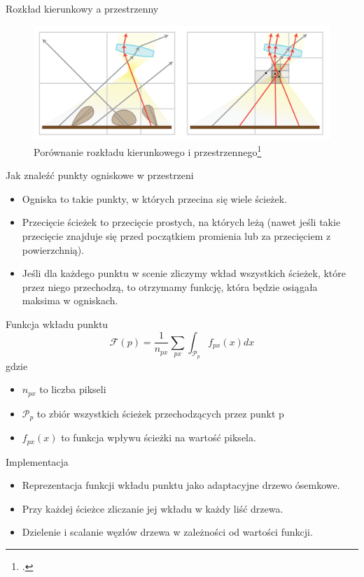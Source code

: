 \documentclass{beamer}
\begin{document}
\begin{frame}{Rozkład kierunkowy a przestrzenny}
    \begin{figure}
        \centering
        \includegraphics[width=1\linewidth]{img/directional_vs_spatial.png}
        \caption{Porównanie rozkładu kierunkowego i przestrzennego\footcite{Focal_Guiding}}
        \label{fig:enter-label}
    \end{figure}
\end{frame}

\begin{frame}{Jak znaleźć punkty ogniskowe w przestrzeni}
    \begin{itemize}
        \item Ogniska to takie punkty, w których przecina się wiele ścieżek.
        \item Przecięcie ścieżek to przecięcie prostych, na których leżą (nawet jeśli takie przecięcie znajduje się przed początkiem promienia lub za przecięciem z powierzchnią).
        \item Jeśli dla każdego punktu w scenie zliczymy wkład wszystkich ścieżek, które przez niego przechodzą, to otrzymamy funkcję, która będzie osiągała maksima w ogniskach.
    \end{itemize}
\end{frame}

\begin{frame}{Funkcja wkładu punktu}
    $$\mathcal{F}(p) = \frac{1}{n_{px}}\sum_{px}\int_{\mathcal{P}_p}f_{px}(x)dx$$
    gdzie \begin{itemize}
        \item $n_{px}$ to liczba pikseli
        \item $\mathcal{P}_p$ to zbiór wszystkich ścieżek przechodzących przez punkt p
        \item $f_{px}(x)$ to funkcja wpływu ścieżki na wartość piksela.
    \end{itemize}
\end{frame}

\begin{frame}{Implementacja}
\begin{itemize}
    \item Reprezentacja funkcji wkładu punktu jako adaptacyjne drzewo ósemkowe.
    \item Przy każdej ścieżce zliczanie jej wkładu w każdy liść drzewa.
    \item Dzielenie i scalanie węzłów drzewa w zależności od wartości funkcji.
\end{itemize}
\end{frame}
\end{document}

